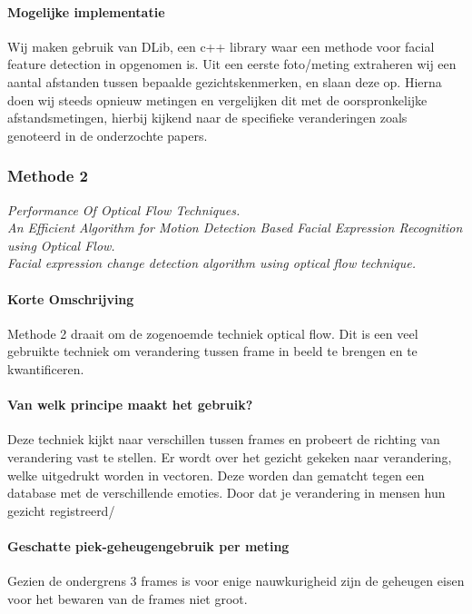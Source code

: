 \documentclass[11pt]{article}
\begin{document}
    \paragraph{Mogelijke implementatie}
    Wij maken gebruik van DLib, een c++ library waar een methode voor facial feature detection in opgenomen is.
    Uit een eerste foto/meting extraheren wij een aantal afstanden tussen bepaalde gezichtskenmerken, en slaan deze op.
    Hierna doen wij steeds opnieuw metingen en vergelijken dit met de oorspronkelijke afstandsmetingen,
    hierbij kijkend naar de specifieke veranderingen zoals genoteerd in de onderzochte papers.

    \subsubsection{Methode 2}
    \emph{\citet{Performance_Of_Optical_Flow_Techniques} Performance Of Optical Flow Techniques.}\\
    \emph{\citet{An_Efficient_Algorithm_for_Motion_Detection_Based_Facial_Expression_Recognition_using_Optical_Flow} An Efficient Algorithm for Motion Detection Based Facial Expression Recognition using Optical Flow.}\\
    \emph{\citet{Facial_expression_change_detection_algorithm_using_optical_flow_technique} Facial expression change detection algorithm using optical flow technique.}\\

    \paragraph{Korte Omschrijving}
    Methode 2 draait om de zogenoemde techniek optical flow. 
    Dit is een veel gebruikte techniek om verandering tussen frame in beeld te brengen en te kwantificeren.   

    \paragraph{Van welk principe maakt het gebruik?}
    Deze techniek kijkt naar verschillen tussen frames en probeert de richting van verandering vast te stellen. 
    Er wordt over het gezicht gekeken naar verandering, welke uitgedrukt worden in vectoren.
    Deze worden dan gematcht tegen een database met de verschillende emoties.
    Door dat je verandering in mensen hun gezicht registreerd/

    \paragraph{Geschatte piek-geheugengebruik per meting}
    Gezien de ondergrens 3 frames is voor enige nauwkurigheid zijn de geheugen eisen voor het bewaren van de frames niet groot. 
\end{document}
